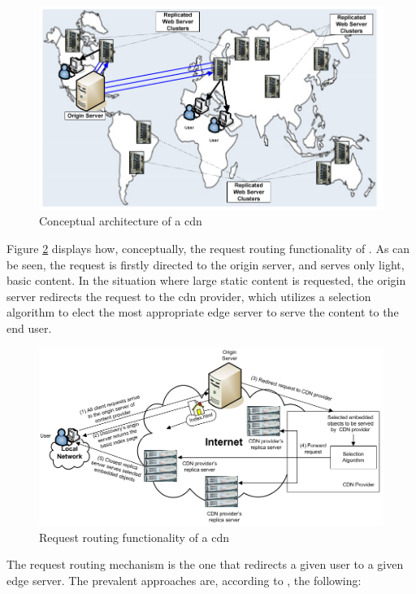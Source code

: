 \begin{figure}[!h]
\centering
\includegraphics[scale=0.65]{img/cdn-architecture.png}
\caption{Conceptual architecture of a \gls{cdn} \cite{cdn-survey}}
\label{fig:cdn-conceptual-architecture}
\end{figure}

    Figure \ref{fig:cdn-request-routing} displays how, conceptually, the request routing functionality of .
    As can be seen, the request is firstly directed to the origin server, and serves only light, basic content.
    In the situation where large static content is requested, the origin server redirects the request to the \gls{cdn} provider, which utilizes a selection algorithm to elect the most appropriate edge server to serve the content to the end user.

\begin{figure}[ht]
\centering
\includegraphics[scale=0.5]{img/cdn-request-routing.png}
\caption{Request routing functionality of a \gls{cdn} \cite{cdn-survey}}
\label{fig:cdn-request-routing}
\end{figure}

    The request routing mechanism is the one that redirects a given user to a given edge server.
    The prevalent approaches are, according to \cite{wichtlhuber2017}, the following:

